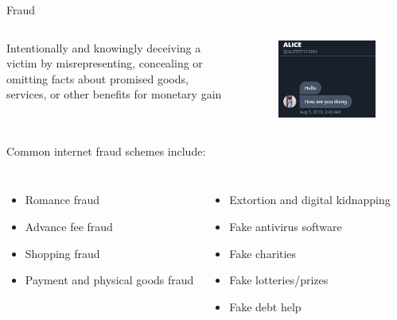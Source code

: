\documentclass[nobackground,dvipsnames,table]{beamer}
\begin{document}
\begin{frame}{Fraud}
    \begin{columns}
            Intentionally and knowingly deceiving a victim by misrepresenting, concealing or omitting facts about promised goods, services, or other benefits for monetary gain
            \begin{figure}
                \centering
                \includegraphics[width=\textwidth]{ALICE}
            \end{figure}
    \end{columns}
    Common internet fraud schemes include:
    \begin{columns}
            \begin{itemize}
                \item Romance fraud
                \item Advance fee fraud
                \item Shopping fraud
                \item Payment and physical goods fraud
            \end{itemize}
            \begin{itemize}
                \item Extortion and digital kidnapping
                \item Fake antivirus software
                \item Fake charities
                \item Fake lotteries/prizes
                \item Fake debt help
            \end{itemize}
    \end{columns}
\end{frame}
\end{document}
